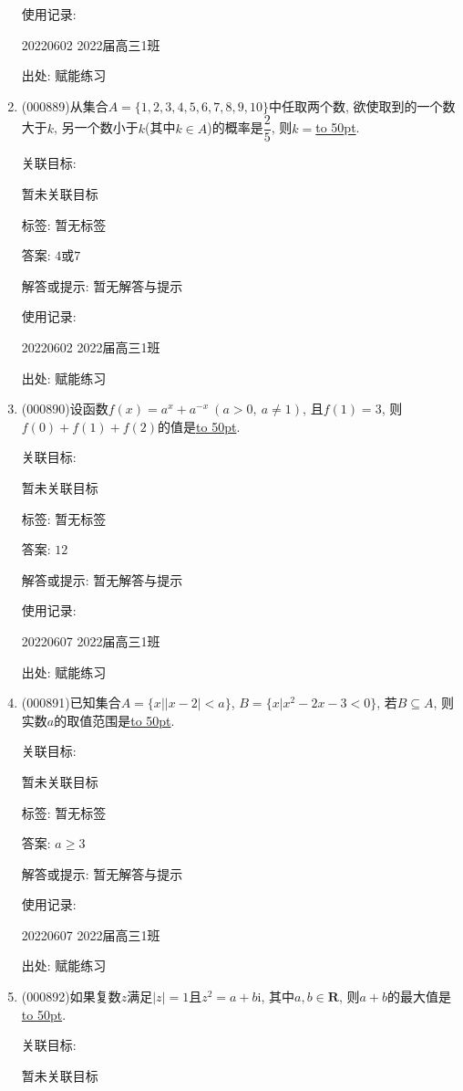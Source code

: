 \documentclass[10pt,a4paper]{article}
\newcommand{\blank}[1]{\underline{\hbox to #1pt{}}}
\begin{document}
\begin{enumerate}[1.]
使用记录:

20220602	2022届高三1班	


出处: 赋能练习
\item { (000889)}从集合$A=\{1,2,3,4,5,6,7,8,9,10\}$中任取两个数, 欲使取到的一个数大于$k$, 另一个数小于$k$(其中$k\in A$)的概率是$\dfrac25$, 则$k=$\blank{50}.


关联目标:

暂未关联目标



标签: 暂无标签

答案: $4$或$7$

解答或提示: 暂无解答与提示

使用记录:

20220602	2022届高三1班	


出处: 赋能练习
\item { (000890)}设函数$f(x)=a^x+a^{-x}  \ (a>0, \ a\ne 1)$, 且$f(1)=3$, 则$f(0)+f(1)+f(2)$的值是\blank{50}.


关联目标:

暂未关联目标



标签: 暂无标签

答案: $12$

解答或提示: 暂无解答与提示

使用记录:

20220607	2022届高三1班	


出处: 赋能练习
\item { (000891)}已知集合$A=\{x||x-2|<a\}$, $B=\{x|x^2-2x-3<0\}$, 若$B\subseteq A$, 则实数$a$的取值范围是\blank{50}.


关联目标:

暂未关联目标



标签: 暂无标签

答案: $a\ge 3$

解答或提示: 暂无解答与提示

使用记录:

20220607	2022届高三1班	


出处: 赋能练习
\item { (000892)}如果复数$z$满足$|z|=1$且$z^2=a+b\mathrm{i}$, 其中$a,b\in \mathbf{R}$, 则$a+b$的最大值是\blank{50}.


关联目标:

暂未关联目标




\end{enumerate}
\end{document}
